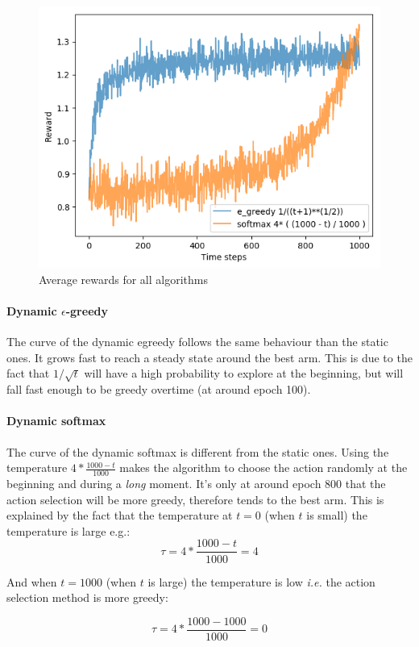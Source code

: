 \documentclass[letterpaper]{article}
\begin{document}
\begin{figure}[H]
    \centering
    \includegraphics[width=.7\linewidth]{images/assign3/ex3/rewards}
    \caption{Average rewards for all algorithms}
    \label{fig:rewards_ex3}
\end{figure}

\paragraph{Dynamic $\epsilon$-greedy}

The curve of the dynamic egreedy follows the same behaviour than the static
ones. It grows fast to reach a steady state around the best arm. This
is due to the fact that $1/{\sqrt{t}}$ will have a high probability to
explore at the beginning, but will fall fast enough to be greedy overtime
(at around epoch 100).

\paragraph{Dynamic softmax}

The curve of the dynamic softmax is different from the static ones. Using
the temperature $4*\frac{1000 - t}{1000}$ makes the algorithm to choose
the action randomly at the beginning and during a \textit{long} moment.
It's only at around epoch 800
that the action selection will be more greedy, therefore
tends to the best arm. This is explained by the fact that the temperature
at $t = 0$ (when $t$ is small) the temperature is large e.g.:
$$
\tau = 4*\frac{1000 - t}{1000} = 4
$$

And when $t = 1000$ (when $t$ is large)
the temperature is low \textit{i.e.} the action selection
method is more greedy:

$$
\tau = 4*\frac{1000 - 1000}{1000} = 0
$$
\end{document}
